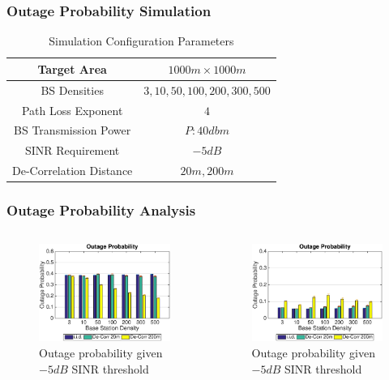 \documentclass{beamer}
\begin{document}
\begin{frame}
\frametitle{Outage Probability Simulation}
\begin{table}
 \centering
 \caption{\label{SystemConfig2}Simulation Configuration Parameters}

 \begin{tabular}{|c|c|}

 \hline
 Target Area & $1000m\times 1000m$\\
 \hline
 BS Densities & $3, 10, 50, 100, 200, 300, 500$\\
 \hline
 Path Loss Exponent & $4$\\
 \hline
 BS Transmission Power & $P: 40dbm$\\
 \hline
 SINR Requirement & $-5dB$\\
 \hline
 De-Correlation Distance & $20m, 200m$\\
 \hline
 \end{tabular}

 \end{table}
\end{frame}

\begin{frame}
\frametitle{Outage Probability Analysis}
\begin{columns}[c]
 \begin{figure}
 \centering
 \includegraphics[width=6cm]{NBMax1000OutageProbThresh-5iid.eps}
 \caption{Outage probability given $-5dB$ SINR threshold}
 \label{fig: outprob1}
 \end{figure}
 \begin{figure}
 \centering
 \includegraphics[width=6cm]{MaxMax1000OutageProbThresh-5iid.eps}
 \caption{Outage probability given $-5dB$ SINR threshold}
 \label{fig: outprobs2}
 \end{figure}
  \end{columns}
\end{frame}
\end{document}
